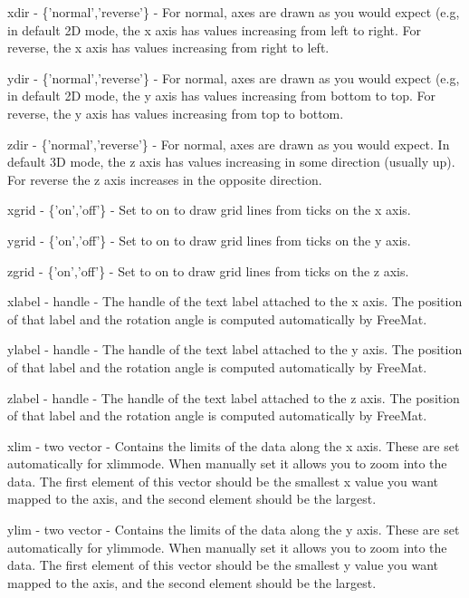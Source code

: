 \begin{DoxyItemize}
\item {\ttfamily xdir} -\/ {\ttfamily \{'normal','reverse'\}} -\/ For {\ttfamily normal}, axes are drawn as you would expect (e.\-g, in default 2\-D mode, the x axis has values increasing from left to right. For {\ttfamily reverse}, the x axis has values increasing from right to left.  
\item {\ttfamily ydir} -\/ {\ttfamily \{'normal','reverse'\}} -\/ For {\ttfamily normal}, axes are drawn as you would expect (e.\-g, in default 2\-D mode, the y axis has values increasing from bottom to top. For {\ttfamily reverse}, the y axis has values increasing from top to bottom.  
\item {\ttfamily zdir} -\/ {\ttfamily \{'normal','reverse'\}} -\/ For {\ttfamily normal}, axes are drawn as you would expect. In default 3\-D mode, the z axis has values increasing in some direction (usually up). For {\ttfamily reverse} the z axis increases in the opposite direction.  
\item {\ttfamily xgrid} -\/ {\ttfamily \{'on','off'\}} -\/ Set to {\ttfamily on} to draw grid lines from ticks on the x axis.  
\item {\ttfamily ygrid} -\/ {\ttfamily \{'on','off'\}} -\/ Set to {\ttfamily on} to draw grid lines from ticks on the y axis.  
\item {\ttfamily zgrid} -\/ {\ttfamily \{'on','off'\}} -\/ Set to {\ttfamily on} to draw grid lines from ticks on the z axis.  
\item {\ttfamily xlabel} -\/ {\ttfamily handle} -\/ The handle of the text label attached to the x axis. The position of that label and the rotation angle is computed automatically by Free\-Mat.  
\item {\ttfamily ylabel} -\/ {\ttfamily handle} -\/ The handle of the text label attached to the y axis. The position of that label and the rotation angle is computed automatically by Free\-Mat.  
\item {\ttfamily zlabel} -\/ {\ttfamily handle} -\/ The handle of the text label attached to the z axis. The position of that label and the rotation angle is computed automatically by Free\-Mat.  
\item {\ttfamily xlim} -\/ {\ttfamily two vector} -\/ Contains the limits of the data along the x axis. These are set automatically for {\ttfamily xlimmode}. When manually set it allows you to zoom into the data. The first element of this vector should be the smallest x value you want mapped to the axis, and the second element should be the largest.  
\item {\ttfamily ylim} -\/ {\ttfamily two vector} -\/ Contains the limits of the data along the y axis. These are set automatically for {\ttfamily ylimmode}. When manually set it allows you to zoom into the data. The first element of this vector should be the smallest y value you want mapped to the axis, and the second element should be the largest.  

\end{DoxyItemize}
